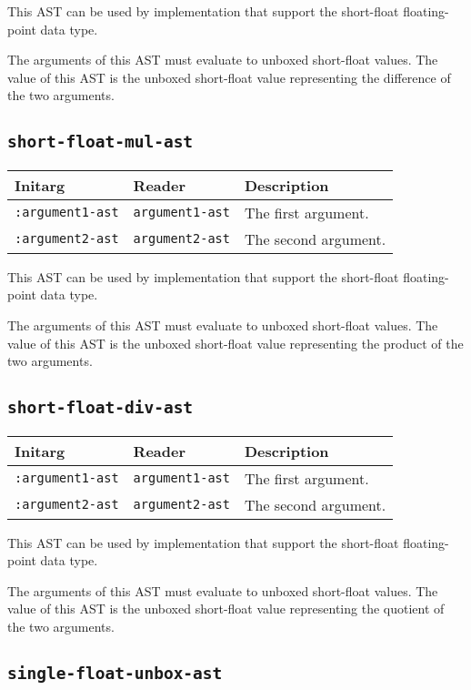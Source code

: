 This AST can be used by implementation that support the short-float
floating-point data type.  

The arguments of this AST must evaluate to unboxed short-float
values.  The value of this AST is the unboxed short-float value
representing the difference of the two arguments.

\subsection{\texttt{short-float-mul-ast}}
\label{sec-ast-short-float-mul}

\begin{tabular}{|l|l|l|}
\hline
Initarg & Reader & Description\\
\hline\hline
\texttt{:argument1-ast} & \texttt{argument1-ast} & The first argument.\\
\hline
\texttt{:argument2-ast} & \texttt{argument2-ast} & The second argument.\\
\hline
\end{tabular}

This AST can be used by implementation that support the short-float
floating-point data type.  

The arguments of this AST must evaluate to unboxed short-float
values.  The value of this AST is the unboxed short-float value
representing the product of the two arguments.

\subsection{\texttt{short-float-div-ast}}
\label{sec-ast-short-float-div}

\begin{tabular}{|l|l|l|}
\hline
Initarg & Reader & Description\\
\hline\hline
\texttt{:argument1-ast} & \texttt{argument1-ast} & The first argument.\\
\hline
\texttt{:argument2-ast} & \texttt{argument2-ast} & The second argument.\\
\hline
\end{tabular}

This AST can be used by implementation that support the short-float
floating-point data type.  

The arguments of this AST must evaluate to unboxed short-float
values.  The value of this AST is the unboxed short-float value
representing the quotient of the two arguments.

\subsection{\texttt{single-float-unbox-ast}}
\label{sec-ast-single-float-unbox}


